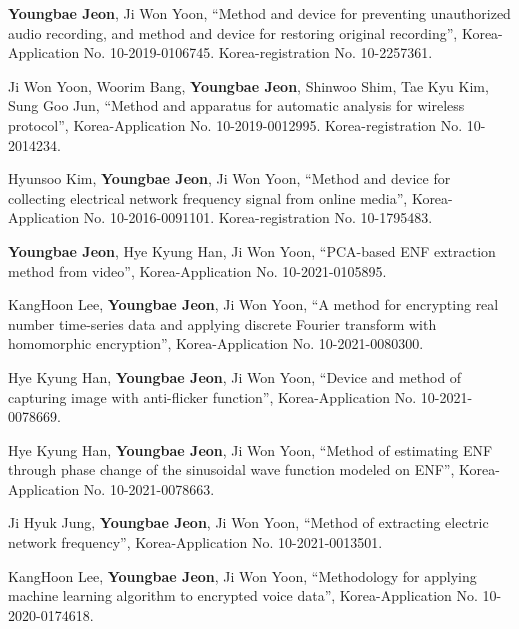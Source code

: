 \documentclass[10pt]{article}
\makeatletter
\newlength{\bibhang}
\newlength{\bibsep}
 {\@listi \global\bibsep\itemsep \global\advance\bibsep by\parsep}
\newenvironment{bibsection}%
        {\vspace{-\baselineskip}\begin{list}{}{%
       \setlength{\leftmargin}{\bibhang}%
       \setlength{\itemindent}{-\leftmargin}%
       \setlength{\itemsep}{\bibsep}%
       \setlength{\parsep}{\z@}%
        \setlength{\partopsep}{0pt}%
        \setlength{\topsep}{0pt}}}
        {\end{list}\vspace{-.6\baselineskip}}
\renewcommand{\section}[2]%
        {\pagebreak[2]\vspace{1.3\baselineskip}%
         \phantomsection\addcontentsline{toc}{section}{#1}%
         \hspace{0in}%
         \marginpar{
         \raggedright \scshape #1}#2}
\newcommand{\blankline}{\quad\pagebreak[2]}
\makeatother
\begin{document}
\section{Patents}
\begin{bibsection}
    \item \textbf{Youngbae Jeon}, Ji Won Yoon, ``Method and device for preventing unauthorized audio recording, and method and device for restoring original recording'', Korea-Application No. 10-2019-0106745. Korea-registration No. 10-2257361.
    \item Ji Won Yoon, Woorim Bang, \textbf{Youngbae Jeon}, Shinwoo Shim, Tae Kyu Kim, Sung Goo Jun, ``Method and apparatus for automatic analysis for wireless protocol'', Korea-Application No. 10-2019-0012995. Korea-registration No. 10-2014234.
    \item Hyunsoo Kim, \textbf{Youngbae Jeon}, Ji Won Yoon, ``Method and device for collecting electrical network frequency signal from online media'', Korea-Application No. 10-2016-0091101. Korea-registration No. 10-1795483.
    \item \textbf{Youngbae Jeon}, Hye Kyung Han, Ji Won Yoon, ``PCA-based ENF extraction method from video'', Korea-Application No. 10-2021-0105895.
    \item KangHoon Lee, \textbf{Youngbae Jeon}, Ji Won Yoon, ``A method for encrypting real number time-series data and applying discrete Fourier transform with homomorphic encryption'', Korea-Application No. 10-2021-0080300.
    \item Hye Kyung Han, \textbf{Youngbae Jeon}, Ji Won Yoon, ``Device and method of capturing image with anti-flicker function'', Korea-Application No. 10-2021-0078669.
    \item Hye Kyung Han, \textbf{Youngbae Jeon}, Ji Won Yoon, ``Method of estimating ENF through phase change of the sinusoidal wave function modeled on ENF'', Korea-Application No. 10-2021-0078663.
    \item Ji Hyuk Jung, \textbf{Youngbae Jeon}, Ji Won Yoon, ``Method of extracting electric network frequency'', Korea-Application No. 10-2021-0013501.
    \item KangHoon Lee, \textbf{Youngbae Jeon}, Ji Won Yoon, ``Methodology for applying machine learning algorithm to encrypted voice data'', Korea-Application No. 10-2020-0174618.
\end{bibsection}

\blankline
\end{document}
